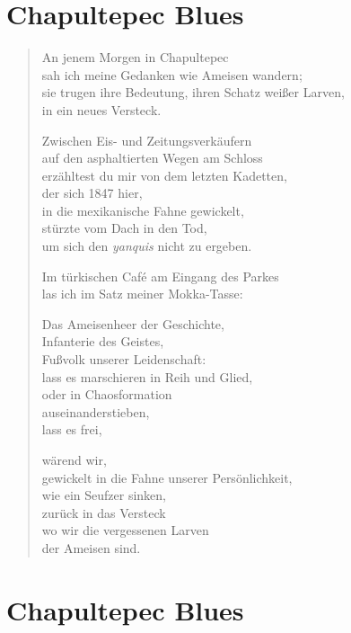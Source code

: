 
\cleartoverso

\section{Chapultepec Blues}


\begin{verse}

An jenem Morgen in Chapultepec\\
sah ich meine Gedanken wie Ameisen wandern;\\
sie trugen ihre Bedeutung, ihren Schatz weißer Larven,\\
in ein neues Versteck.

Zwischen Eis- und Zeitungsverkäufern\\
auf den asphaltierten Wegen am Schloss\\
erzähltest du mir von dem letzten Kadetten,\\
der sich 1847 hier,\\
in die mexikanische Fahne gewickelt,\\
stürzte vom Dach in den Tod,\\
um sich den \emph{yanquis} nicht zu ergeben.

Im türkischen Café am Eingang des Parkes\\
las ich im Satz meiner Mokka-Tasse:

Das Ameisenheer der Geschichte,\\
Infanterie des Geistes,\\
Fußvolk unserer Leidenschaft:\\
lass es marschieren in Reih und Glied,\\
oder in Chaosformation\\
auseinanderstieben,\\
lass es frei,

wärend wir,\\
gewickelt in die Fahne unserer Persönlichkeit,\\
wie ein Seufzer sinken,\\
zurück in das Versteck\\
wo wir die vergessenen Larven\\
der Ameisen sind.

\end{verse}

\clearpage

\section{Chapultepec Blues}

